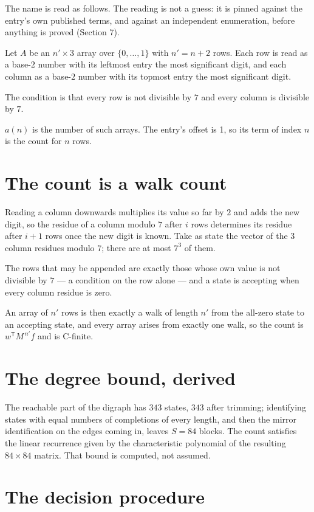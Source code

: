 \documentclass[11pt]{article}
\theoremstyle{definition}
\begin{document}
The name is read as follows. The reading is not a guess: it is pinned against the entry's own published terms, and against an independent enumeration, before anything is proved (Section 7).

Let $A$ be an $n' \times 3$ array over $\{0,\dots,1\}$ with $n' = n + 2$ rows. Each row is read as a base-$2$ number with its leftmost entry the most significant digit, and each column as a base-$2$ number with its topmost entry the most significant digit.

The condition is that every row is not divisible by $7$ and every column is divisible by $7$.

$a(n)$ is the number of such arrays. The entry's offset is 1, so its term of index $n$ is the count for $n$ rows.

\section{The count is a walk count}

Reading a column downwards multiplies its value so far by $2$ and adds the new digit, so the residue of a column modulo $7$ after $i$ rows determines its residue after $i+1$ rows once the new digit is known. Take as state the vector of the $3$ column residues modulo $7$; there are at most $7^{3}$ of them.

The rows that may be appended are exactly those whose own value is not divisible by $7$ --- a condition on the row alone --- and a state is accepting when every column residue is zero.

An array of $n'$ rows is then exactly a walk of length $n'$ from the all-zero state to an accepting state, and every array arises from exactly one walk, so the count is $w^{\mathsf T}M^{\,n'}f$ and is C-finite.

\section{The degree bound, derived}

The reachable part of the digraph has $343$ states, $343$ after trimming; identifying states with equal numbers of completions of every length, and then the mirror identification on the edges coming in, leaves $S = 84$ blocks. The count satisfies the linear recurrence given by the characteristic polynomial of the resulting $84\times84$ matrix. That bound is computed, not assumed.

\section{The decision procedure}
\end{document}
